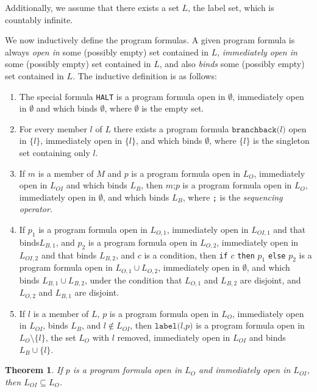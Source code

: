 \documentclass[11pt]{article}
\begin{document}
Additionally, we assume that there exists a set $L$, the label set, which is countably infinite.

We now inductively define the program formulas.  A given program formula is always \emph{open in} some (possibly empty) set contained in $L$, \emph{immediately open in} some (possibly empty) set contained in $L$, and also \emph{binds} some (possibly empty) set contained in $L$.  The inductive definition is as follows:

\begin{enumerate}
\item The special formula \texttt{HALT} is a program formula open in $\emptyset$, immediately open in $\emptyset$ and which binds $\emptyset$, where $\emptyset$ is the empty set.
\item For every member $l$ of $L$ there exists a program formula $\texttt{branchback(}l\texttt{)}$ open in $\{l\}$, immediately open in $\{l\}$, and which binds $\emptyset$, where $\{l\}$ is the singleton set containing only $l$.
\item If $m$ is a member of $M$ and $p$ is a program formula open in $L_{O}$, immediately open in $L_{OI}$ and which binds $L_{B}$, then $m\texttt{;}p$ is a program formula open in $L_{O}$, immediately open in $\emptyset$, and which binds $L_{B}$, where \texttt{;} is the \emph{sequencing operator}.
\item If $p_{1}$ is a program formula open in $L_{O,1}$, immediately open in $L_{OI,1}$ and that binds$L_{B,1}$, and $p_{2}$ is a program formula open in $L_{O,2}$, immediately open in $L_{OI,2}$ and that binds $L_{B,2}$, and $c$ is a condition, then \texttt{if} $c$ \texttt{then} $p_{1}$ \texttt{else} $p_{2}$ is a program formula open in $L_{O,1} \cup L_{O,2}$, immediately open in $\emptyset$, and which binds $L_{B,1} \cup L_{B,2}$, under the condition that $L_{O,1}$ and $L_{B,2}$ are disjoint, and $L_{O,2}$ and $L_{B,1}$ are disjoint.
\item If $l$ is a member of $L$, $p$ is a program formula open in $L_{O}$, immediately open in $L_{OI}$, binds $L_{B}$, and $l \notin L_{OI}$, then $\texttt{label(}l\texttt{,} p\texttt{)}$ is a program formula open in $L_{O} \setminus \{l\}$, the set $L_{O}$ with $l$ removed, immediately open in $L_{OI}$ and binds $L_{B} \cup \{l\}$.
\end{enumerate}

\newtheorem*{immedopencontainedinopen}{Theorem}
\begin{immedopencontainedinopen}
If $p$ is a program formula open in $L_{O}$ and immediately open in $L_{OI}$, then $L_{OI} \subseteq L_{O}$.
\end{immedopencontainedinopen}
\end{document}
